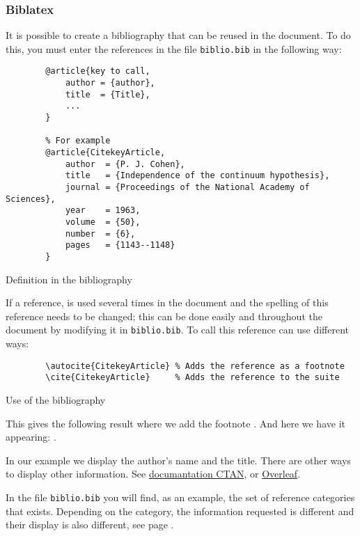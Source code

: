 \subsubsection{Biblatex}
It is possible to create a bibliography that can be reused in the document.
To do this, you must enter the references in the file \verb=biblio.bib= in the following way:
\begin{code}
    \begin{verbatim}
        @article{key to call,
            author = {author},
            title  = {Title},
            ...
        }

        % For example
        @article{CitekeyArticle,
            author  = {P. J. Cohen},
            title   = {Independence of the continuum hypothesis},
            journal = {Proceedings of the National Academy of Sciences},
            year    = 1963,
            volume  = {50},
            number  = {6},
            pages   = {1143--1148}
        }
\end{verbatim}
    \caption{Definition in the bibliography}
\end{code}

If a reference, is used several times in the document and the spelling of this reference
needs to be changed; this can be done easily and throughout the document by modifying it in
\verb=biblio.bib=.
To call this reference can use different ways:
\begin{code}
    \begin{verbatim}
        \autocite{CitekeyArticle} % Adds the reference as a footnote
        \cite{CitekeyArticle}     % Adds the reference to the suite
\end{verbatim}
    \caption{Use of the bibliography}
\end{code}

This gives the following result where we add the footnote \autocite{CitekeyArticle}.
And here we have it appearing: \cite{CitekeyArticle}. \newline

In our example we display the author's name and the title. There are other ways to display other information.
See \href{https://mirror.ibcp.fr/pub/CTAN/macros/latex/contrib/biblatex/doc/biblatex.pdf#subsection.3.9}{documantation CTAN}, or \href{https://fr.overleaf.com/learn/latex/Bibliography_management_with_bibtex}{Overleaf}. \newline

In the file \verb=biblio.bib= you will find, as an example, the set of reference categories that exists.
Depending on the category, the information requested is different and their display is also different,
see page \pageref{bibliography}.